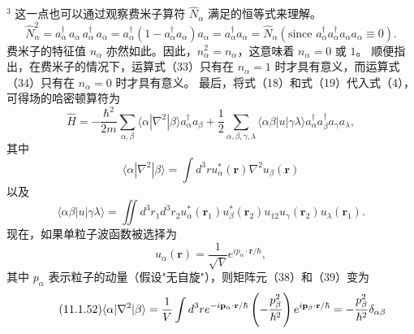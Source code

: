 \(^{3}\) 这一点也可以通过观察费米子算符 \(\hat{N}_{\alpha}\) 满足的恒等式来理解。
\begin{equation}\tag{11.1.47}\label{eq:11.1.47}
\hat { N } _ { \alpha } ^{2} = a _ { \alpha } ^{\dagger} \, a _ { \alpha } \, a _ { \alpha } ^{\dagger} \, a _ { \alpha } = a _ { \alpha } ^{\dagger} ( 1 - a _ { \alpha } ^{\dagger} a _ { \alpha } ) a _ { \alpha } = a _ { \alpha } ^{\dagger} a _ { \alpha } = \hat { N } _ { \alpha }  ( \mathrm { s i n c e } \, \, a _ { \alpha } ^{\dagger} a _ { \alpha } ^{\dagger} a _ { \alpha } a _ { \alpha } \equiv 0 ) .
\end{equation}
费米子的特征值 \(n_{\alpha}\) 亦然如此。因此，\(n_{\alpha}^{2}=n_{\alpha}\)，这意味着 \(n_{\alpha}=0\) 或 \(1\)。
顺便指出，在费米子的情况下，运算式（33）只有在 \(n_{\alpha}=1\) 时才具有意义，而运算式（34）只有在 \(n_{\alpha}=0\) 时才具有意义。
最后，将式（18）和式（19）代入式（4），可得场的哈密顿算符为
\begin{equation}\tag{11.1.48}\label{eq:11.1.48}
\hat { H } = - \frac { \hbar ^{2} } { 2 m } \sum _ { \alpha , \beta } \langle \alpha | \nabla ^{2} | \beta \rangle a _ { \alpha } ^{\dagger} a _ { \beta } + \frac { 1 } { 2 } \sum _ { \alpha , \beta , \gamma , \lambda } \langle \alpha \beta | u | \gamma \lambda \rangle a _ { \alpha } ^{\dagger} a _ { \beta } ^{\dagger} a _ { \gamma } a _ { \lambda } ,
\end{equation}
其中
\begin{equation}\tag{11.1.49}\label{eq:11.1.49}
\langle \alpha | \nabla ^{2} | \beta \rangle = \int d ^{3} r u _ { \alpha } ^{*} ( \pmb { r } ) \nabla ^{2} u _ { \beta } ( \pmb { r } )
\end{equation}
以及
\begin{equation}\tag{11.1.50}\label{eq:11.1.50}
\langle \alpha \beta | u | \gamma \lambda \rangle = \iint d ^{3} r _ { 1 } d ^{3} r _ { 2 } u _ { \alpha } ^{*} ( \pmb { r } _ { 1 } ) u _ { \beta } ^{*} ( \pmb { r } _ { 2 } ) u _ { 12 } u _ { \gamma } ( \pmb { r } _ { 2 } ) u _ { \lambda } ( \pmb { r } _ { 1 } ) .
\end{equation}
现在，如果单粒子波函数被选择为
\begin{equation}\tag{11.1.51}\label{eq:11.1.51}
u _ { \alpha } ( \pmb { r } ) = \frac { 1 } { \sqrt { V } } e ^{i p _ { \alpha} \cdot \pmb { r } / \hbar } ,
\end{equation}
其中 \(p_{\alpha}\) 表示粒子的动量（假设"无自旋"），则矩阵元（38）和（39）变为
\begin{equation}\tag{11.1.52}\label{eq:11.1.52}
\langle \alpha | \nabla ^{2} | \beta \rangle = \frac { 1 } { V } \int d ^{3} r e ^{- i { \bf p} _ { \alpha } \cdot { \bf r } / \hbar } \left( - \frac { p _ { \beta } ^{2} } { \hbar ^{2} } \right) e ^{i { \bf p} _ { \beta } \cdot { \bf r } / \hbar } = - \frac { p _ { \beta } ^{2} } { \hbar ^{2} } \delta _ { \alpha \beta }
\end{equation}
